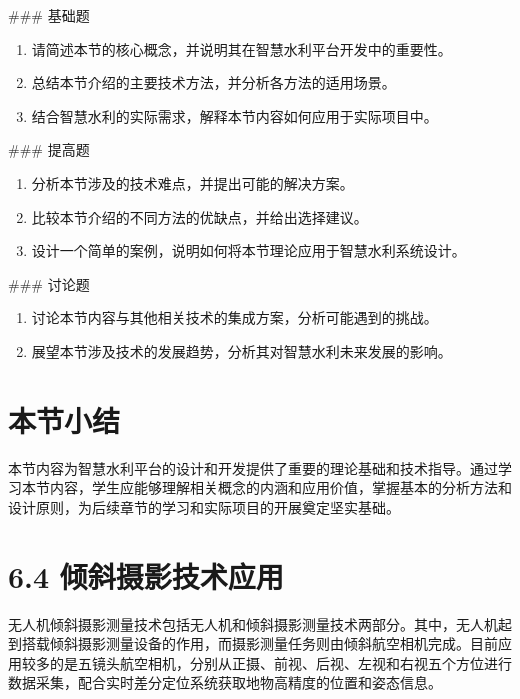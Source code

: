 \#\#\# 基础题

\begin{enumerate}
\def\labelenumi{\arabic{enumi}.}
\tightlist
\item
  请简述本节的核心概念，并说明其在智慧水利平台开发中的重要性。
\item
  总结本节介绍的主要技术方法，并分析各方法的适用场景。
\item
  结合智慧水利的实际需求，解释本节内容如何应用于实际项目中。
\end{enumerate}

\#\#\# 提高题

\begin{enumerate}
\def\labelenumi{\arabic{enumi}.}
\setcounter{enumi}{3}
\tightlist
\item
  分析本节涉及的技术难点，并提出可能的解决方案。
\item
  比较本节介绍的不同方法的优缺点，并给出选择建议。
\item
  设计一个简单的案例，说明如何将本节理论应用于智慧水利系统设计。
\end{enumerate}

\#\#\# 讨论题

\begin{enumerate}
\def\labelenumi{\arabic{enumi}.}
\setcounter{enumi}{6}
\tightlist
\item
  讨论本节内容与其他相关技术的集成方案，分析可能遇到的挑战。
\item
  展望本节涉及技术的发展趋势，分析其对智慧水利未来发展的影响。
\end{enumerate}

\section{本节小结}

本节内容为智慧水利平台的设计和开发提供了重要的理论基础和技术指导。通过学习本节内容，学生应能够理解相关概念的内涵和应用价值，掌握基本的分析方法和设计原则，为后续章节的学习和实际项目的开展奠定坚实基础。

\section{6.4 倾斜摄影技术应用}

无人机倾斜摄影测量技术包括无人机和倾斜摄影测量技术两部分。其中，无人机起到搭载倾斜摄影测量设备的作用，而摄影测量任务则由倾斜航空相机完成。目前应用较多的是五镜头航空相机，分别从正摄、前视、后视、左视和右视五个方位进行数据采集，配合实时差分定位系统获取地物高精度的位置和姿态信息。

